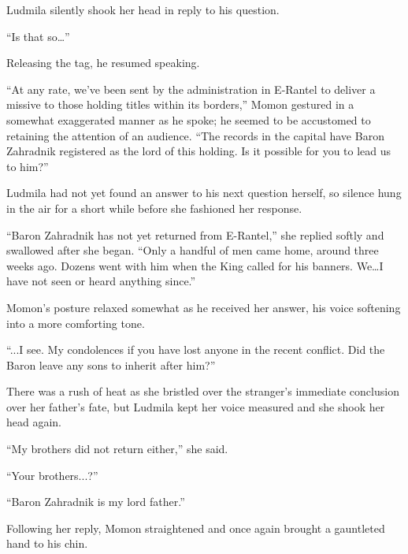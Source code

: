  

Ludmila silently shook her head in reply to his question.

 

“Is that so…”

 

Releasing the tag, he resumed speaking.

 

“At any rate, we’ve been sent by the administration in E-Rantel to deliver a missive to those holding titles within its borders,” Momon gestured in a somewhat exaggerated manner as he spoke; he seemed to be accustomed to retaining the attention of an audience. “The records in the capital have Baron Zahradnik registered as the lord of this holding. Is it possible for you to lead us to him?”

 

Ludmila had not yet found an answer to his next question herself, so silence hung in the air for a short while before she fashioned her response.

 

“Baron Zahradnik has not yet returned from E-Rantel,” she replied softly and swallowed after she began. “Only a handful of men came home, around three weeks ago. Dozens went with him when the King called for his banners. We…I have not seen or heard anything since.”

 

Momon’s posture relaxed somewhat as he received her answer, his voice softening into a more comforting tone.

 

“...I see. My condolences if you have lost anyone in the recent conflict. Did the Baron leave any sons to inherit after him?”

 

There was a rush of heat as she bristled over the stranger’s immediate conclusion over her father’s fate, but Ludmila kept her voice measured and she shook her head again.

 

“My brothers did not return either,” she said.

 

“Your brothers...?”

 

“Baron Zahradnik is my lord father.”

 

Following her reply, Momon straightened and once again brought a gauntleted hand to his chin.

